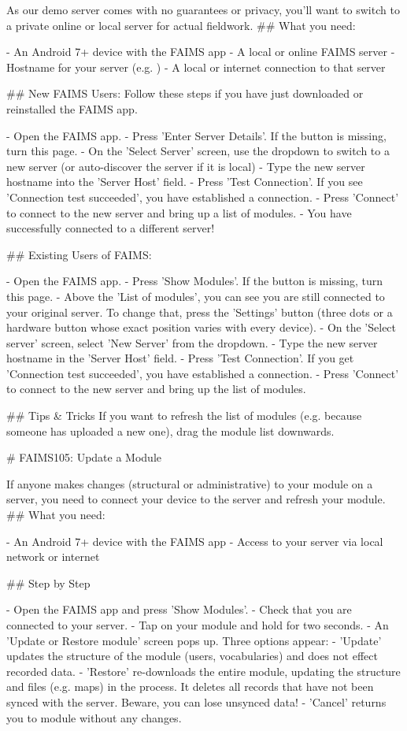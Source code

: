As our demo server comes with no guarantees or privacy, you'll want to switch to a private online or local server for actual fieldwork.
## What you need:


-  An Android 7+ device with the FAIMS app
-  A local or online FAIMS server
-  Hostname for your server (e.g. )
-  A local or internet connection to that server


## New FAIMS Users:
Follow these steps if you have just downloaded or reinstalled the FAIMS app.


-  Open the FAIMS app.
-  Press 'Enter Server Details'. If the button is missing, turn this page.
-  On the 'Select Server' screen, use the dropdown to switch to a new server (or auto-discover the server if it is local)
-  Type the new server hostname into the 'Server Host' field.
-  Press 'Test Connection'. If you see 'Connection test succeeded', you have established a connection.
-  Press 'Connect' to connect to the new server and bring up a list of modules.
-  You have successfully connected to a different server!



## Existing Users of FAIMS:


-  Open the FAIMS app.
-  Press 'Show Modules'. If the button is missing, turn this page.
-  Above the 'List of modules', you can see you are still connected to your original server. To change that, press the 'Settings' button (three dots or a hardware button whose exact position varies with every device).
-  On the 'Select server' screen, select 'New Server' from the dropdown.
-  Type the new server hostname in the 'Server Host' field.
-  Press 'Test Connection'. If you get 'Connection test succeeded', you have established a connection.
-  Press 'Connect' to connect to the new server and bring up the list of modules.


## Tips & Tricks
If you want to refresh the list of modules (e.g. because someone has uploaded a new one), drag the module list downwards.


# FAIMS105: Update a Module


If anyone makes changes (structural or administrative) to your module on a server, you need to connect your device to the server and refresh your module.
## What you need:


-  An Android 7+ device with the FAIMS app
-  Access to your server via local network or internet


## Step by Step


-  Open the FAIMS app and press 'Show Modules'.
-  Check that you are connected to your server.
-  Tap on your module and hold for two seconds.
-  An 'Update or Restore module' screen pops up. Three options appear:
-  'Update' updates the structure of the module (users, vocabularies) and does not effect recorded data.
-  'Restore' re-downloads the entire module, updating the structure and files (e.g. maps) in the process. It deletes all records that have not been synced with the server. Beware, you can lose unsynced data!
-  'Cancel' returns you to module without any changes.



